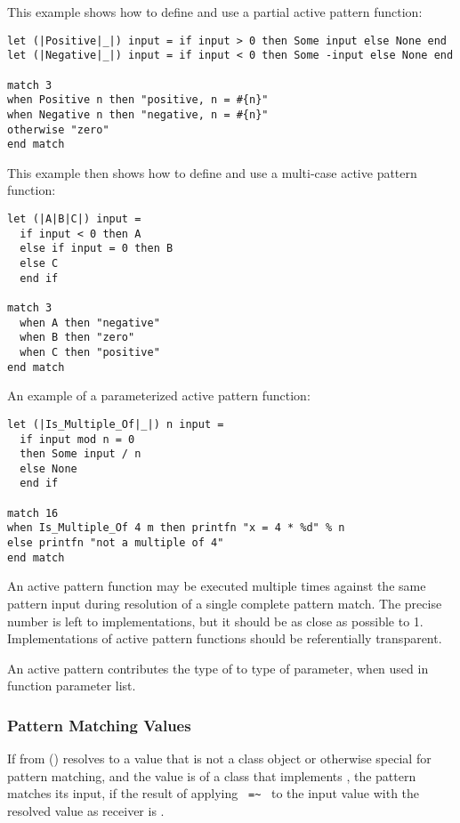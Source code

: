 \example This example shows how to define and use a partial active pattern function:
\begin{lstlisting}
let (|Positive|_|) input = if input > 0 then Some input else None end
let (|Negative|_|) input = if input < 0 then Some -input else None end

match 3
when Positive n then "positive, n = #{n}"
when Negative n then "negative, n = #{n}"
otherwise "zero"
end match
\end{lstlisting}

\example This example then shows how to define and use a multi-case active pattern function:
\begin{lstlisting}
let (|A|B|C|) input = 
  if input < 0 then A
  else if input = 0 then B
  else C
  end if
  
match 3
  when A then "negative"
  when B then "zero"
  when C then "positive"
end match
\end{lstlisting}

\example An example of a parameterized active pattern function:
\begin{lstlisting}[deletekeywords={not,of}]
let (|Is_Multiple_Of|_|) n input = 
  if input mod n = 0
  then Some input / n
  else None
  end if
  
match 16
when Is_Multiple_Of 4 m then printfn "x = 4 * %d" % n
else printfn "not a multiple of 4"
end match
\end{lstlisting}

An active pattern function may be executed multiple times against the same pattern input during resolution of a single complete pattern match. The precise number is left to implementations, but it should be as close as possible to 1. Implementations of active pattern functions should be referentially transparent. 

An active pattern contributes the type of  to type of parameter, when used in function parameter list. 





\subsubsection{Pattern Matching Values}
\label{sec:pattern-matching-values}

If  from () resolves to a value that is not a class object or otherwise special for pattern matching, and the value is of a class that implements , the pattern matches its input, if the result of applying ~\lstinline!=~!~ to the input value with the resolved value as receiver is .

